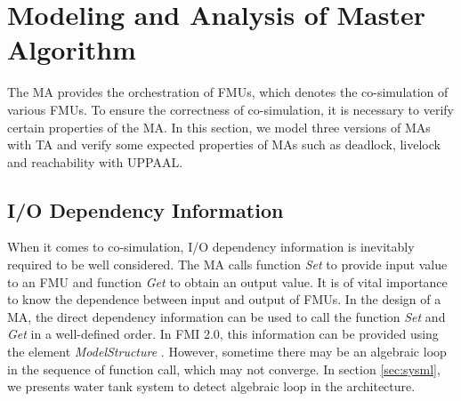 \section{Modeling and Analysis of Master Algorithm}
\label{sec:ma}
The MA provides the orchestration of FMUs, which denotes the co-simulation of various FMUs. To ensure the correctness of co-simulation, it is necessary to verify certain properties of the MA. In this section, we model three versions of MAs with TA and verify some expected properties of MAs such as deadlock, livelock and reachability with UPPAAL.
\subsection{I/O Dependency Information}
When it comes to co-simulation, I/O dependency information \cite{BromanBGLMTW13} is inevitably required to be well considered. The MA calls function \emph{Set} to provide input value to an FMU and function \emph{Get} to obtain an output value. It is of vital importance to know the dependence between input and output of FMUs. In the design of a MA, the direct dependency information can be used to call the function \emph{Set} and \emph{Get} in a well-defined order. In FMI 2.0, this information can be provided using the element \emph{ModelStructure} \cite{FMI2INTRO}. However, sometime there may be an algebraic loop in the sequence of function call, which may not converge. In section \ref{sec:sysml}, we presents water tank system to detect algebraic loop in the architecture.
